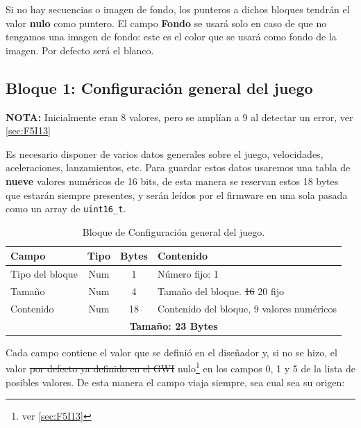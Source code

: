 Si no hay secuencias o imagen de fondo, los punteros a dichos bloques tendrán el valor \textbf{nulo} como puntero. El campo \textbf{Fondo} se usará solo en caso de que no tengamos una imagen de fondo: este es el color que se usará como fondo de la imagen. Por defecto será el blanco.


\subsection{Bloque 1: Configuración general del juego}
\label{sec:F5I2ConfGen}

\textbf{NOTA:} Inicialmente eran 8 valores, pero se amplían a 9 al detectar un error, ver \ref{sec:F5I13}

Es necesario disponer de varios datos generales sobre el juego, velocidades, aceleraciones, lanzamientos, etc. Para guardar estos datos usaremos una tabla de \textbf{nueve} valores numéricos de 16 bits, de esta manera se reservan estos 18 bytes que estarán siempre presentes, y serán leídos por el firmware en una sola pasada como un array de \texttt{uint16\_t}.

\begin{table}[htbp]
	\centering
	\begin{tabular}{|l|c|c|p{8.4cm}|}
		\hline
		\textbf{Campo} & \textbf{Tipo} & \textbf{Bytes} & \textbf{Contenido} \\
		\hline
		Tipo del bloque & Num & 1 & Número fijo: 1\\
		\hline
		
		Tamaño & Num & 4 & Tamaño del bloque. \sout{16} 20 fijo \\
		\hline
		
		Contenido & Num & 18 & Contenido del bloque, 9 valores numéricos \\
		
		\hline\hline
		\multicolumn{4}{c}{\textbf{Tamaño: 23 Bytes}} \\ \hline
	\end{tabular}
	\caption{Bloque de Configuración general del juego.}
\end{table}

Cada campo contiene
el valor que se definió en el diseñador y, si no se hizo, el valor \sout{por
defecto ya definido en el GWI} nulo\footnote{ver \ref{sec:F5I13}} en los campos 0, 1 y 5 de la lista de posibles valores. De esta manera el campo viaja siempre, sea cual
sea su origen:

